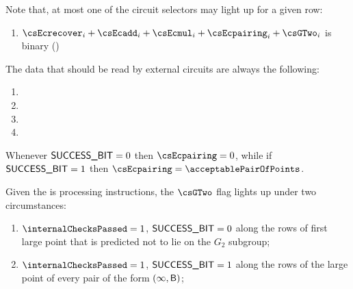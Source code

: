Note that, at most one of the circuit selectors may light up for a given row:
\begin{enumerate}
    \item $\csEcrecover_{i} + \csEcadd_{i} + \csEcmul_{i} + \csEcpairing_{i} + \csGTwo_{i}$ is binary \quad (\trash)
\end{enumerate}
The data that should be read by external circuits are always the following:
\begin{enumerate}
    \item \ecdataId{}
    \item \ecdataIndex{}
    \item \ecdataLimb{}
    \item \ecdataSuccessBit{}
\end{enumerate}

\saNote{}
Whenever $\textsf{SUCCESS\_BIT} = 0$ then $\csEcpairing = 0$, while if $\textsf{SUCCESS\_BIT} = 1$ then $\csEcpairing = \acceptablePairOfPoints$.

\saNote{}
Given the \ecDataMod{} is processing  instructions, the $\csGTwo$ flag lights up under two circumstances:
\begin{enumerate} 
    \item $\internalChecksPassed = 1$, $\textsf{SUCCESS\_BIT} = 0$ along the rows of first large point that is predicted not to lie on the $G_2$ subgroup;
    \item $\internalChecksPassed = 1$, $\textsf{SUCCESS\_BIT} = 1$ along the rows of the large point of every pair of the form $(\infty, \textsf{B})$;
\end{enumerate}




